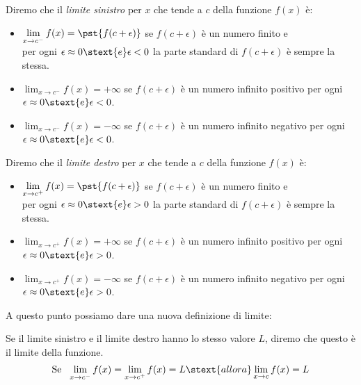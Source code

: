 \begin{definizione}
Diremo che il \emph{limite sinistro} per \(x\) che tende a \(c\) 
della funzione \(f(x)\) è:
\noindent \begin{itemize}
\item 
\(\displaystyle \lim_{x \to c^-}f(x) = \pst{f(c+\epsilon)}\)
se \(f(c+\epsilon)\) è un numero finito e \\
per ogni \(\epsilon \approx 0 \stext{e} \epsilon < 0\)
la parte standard di \(f(c+\epsilon)\) è sempre la stessa.
\item 
\(\displaystyle \lim_{x \to c^-}f(x) = +\infty\)
se \(f(c+\epsilon)\) è un numero infinito positivo 
per ogni \(\epsilon \approx 0 \stext{e} \epsilon < 0\).
\item 
\(\displaystyle \lim_{x \to c^-}f(x) = -\infty\)
se \(f(c+\epsilon)\) è un numero infinito negativo 
per ogni \(\epsilon \approx 0 \stext{e} \epsilon < 0\).
\end{itemize}
\end{definizione}

\begin{definizione}
Diremo che il \emph{limite destro} per \(x\) che tende a \(c\) 
della funzione \(f(x)\) è:
\begin{itemize}
\item 
\(\displaystyle \lim_{x \to c^+}f(x) = \pst{f(c+\epsilon)}\)
se \(f(c+\epsilon)\) è un numero finito e \\
per ogni \(\epsilon \approx 0 \stext{e} \epsilon > 0\)
la parte standard di \(f(c+\epsilon)\) è sempre la stessa.
\item 
\(\displaystyle \lim_{x \to c^+}f(x) = +\infty\)
se \(f(c+\epsilon)\) è un numero infinito positivo 
per ogni \(\epsilon \approx 0 \stext{e} \epsilon > 0\).
\item 
\(\displaystyle \lim_{x \to c^+}f(x) = -\infty\)
se \(f(c+\epsilon)\) è un numero infinito negativo 
per ogni \(\epsilon \approx 0 \stext{e} \epsilon > 0\).
\end{itemize}
\end{definizione}
A questo punto possiamo dare una nuova definizione di limite:
\begin{definizione}
Se il limite sinistro e il limite destro hanno lo stesso valore \(L\), 
diremo che questo è il limite della funzione.
\[\displaystyle \text{Se }~
\lim_{x \to c^-}f(x) = \lim_{x \to c^+}f(x) = L \stext{ allora }
\lim_{x \to c}f(x) = L \]
\end{definizione}

